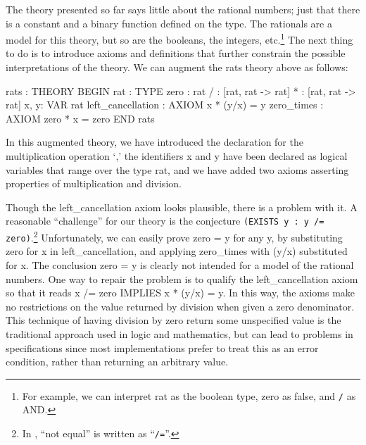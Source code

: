 The theory presented so far says little about the rational numbers; just
that there is a constant and a binary function defined on the type.  The
rationals are a model for this theory, but so are the booleans, the
integers, etc.\footnote{For example, we can interpret {\stt rat} as the
boolean type, {\stt zero} as {\sc false}, and {\tt /} as {\stt AND}.} The
next thing to do is to introduce axioms and definitions that further
constrain the possible interpretations of the theory.  We can
augment the {\stt rats} theory above as follows:
\begin{pvsexample}
  rats : THEORY
   BEGIN
    rat : TYPE
    zero : rat
    / : [rat, rat -> rat]
    * : [rat, rat -> rat]
    x, y: VAR rat
    left\_cancellation : AXIOM x * (y/x)  = y
    zero_times : AXIOM zero * x = zero
   END rats
\end{pvsexample}
%
In this augmented theory, we have introduced the declaration for the
multiplication operation `{\tt *},' the identifiers {\stt x} and {\stt y}
have been declared as logical variables that range over the type {\stt
rat}, and we have added two axioms asserting properties of
multiplication and division.

Though the {\stt left\_cancellation} axiom looks plausible, there is a
problem with it.  A reasonable ``challenge'' for our theory is the
conjecture {\tt (EXISTS y : y /= zero)}.\footnote{In \pvs, ``not equal''
is written as ``{\tt /=}''.} Unfortunately, we can easily prove {\stt
zero = y} for any {\stt y}, by substituting {\stt zero} for {\stt x} in
{\stt left\_cancellation}, and applying {\stt zero\_times} with {\stt
(y/x)} substituted for {\stt x}.  The conclusion {\stt zero = y} is
clearly not intended for a model of the rational numbers.  One way to
repair the problem is to qualify the {\stt left\_cancellation} axiom so
that it reads {\stt x /= zero IMPLIES x * (y/x) = y}. In this way, the
axioms make no restrictions on the value returned by division when given
a zero denominator.  This technique of having division by zero return
some unspecified value is the traditional approach used in logic and
mathematics, but can lead to problems in specifications since most
implementations prefer to treat this as an error condition, rather than
returning an arbitrary value.

